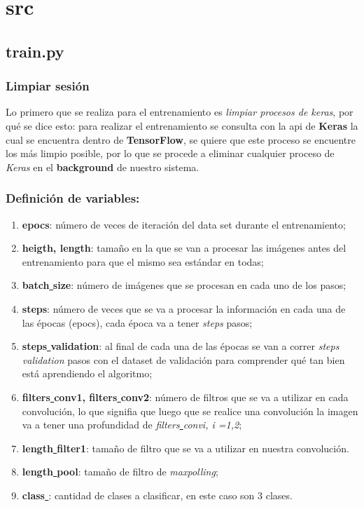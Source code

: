 \documentclass{book}
\begin{document}
		\section{src}
			\subsection{train.py} \label{train}
				\subsubsection{Limpiar sesi\'on}
					Lo primero que se realiza para el entrenamiento es \textit{limpiar procesos de keras}, por qu\'e se dice esto: para realizar el entrenamiento se consulta con la api de \textbf{Keras} la cual se encuentra dentro de \textbf{TensorFlow}, se quiere que este proceso se encuentre los m\'as limpio posible, por lo que se procede a eliminar cualquier proceso de \textit{Keras} en el \textbf{background} de nuestro sistema. \\
				
				\subsubsection{Definici\'on de variables:}
					\begin{enumerate}
						\item \textbf{epocs}: n\'umero de veces de iteraci\'on del data set durante el entrenamiento;
						\item \textbf{heigth, length}: tama\~no en la que se van a procesar las im\'agenes antes del entrenamiento para que el mismo sea est\'andar en todas;
						\item \textbf{batch\underline{ }size}: n\'umero de im\'agenes que se procesan en cada uno de los pasos;
						\item \textbf{steps}: n\'umero de veces que se va a procesar la informaci\'on en cada una de las \'epocas (epocs), cada \'epoca va a tener \textit{steps} pasos;
						\item \textbf{steps\underline{ }validation}: al final de cada una de las \'epocas se van a correr \textit{steps\underline{ }validation} pasos con el dataset de validaci\'on para comprender qu\'e tan bien est\'a aprendiendo el algoritmo;
						\item \textbf{filters\underline{ }conv1, filters\underline{ }conv2}: n\'umero de filtros que se va a utilizar en cada convoluci\'on, lo que signifia que luego que se realice una convoluci\'on la imagen va a tener una profundidad de \textit{filters\underline{ }convi, i =1,2};
						\item \textbf{length\underline{ }filter1}: tama\~no de filtro que se va a utilizar en nuestra convoluci\'on.
						\item \textbf{length\underline{ }pool}: tama\~no de filtro de \textit{maxpolling};
						\item \textbf{class\underline{ }}: cantidad de clases a clasificar, en este caso son 3 clases.
					
					\end{enumerate}
				
\end{document}
